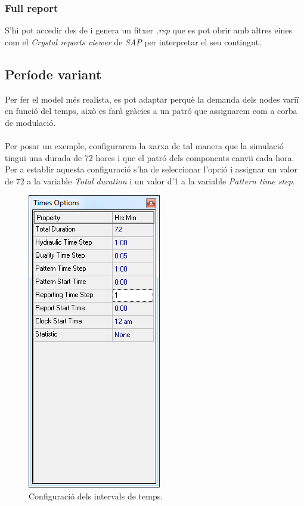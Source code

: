 \documentclass[12pt]{article}
\begin{document}
\pagebreak
\subsubsection{Full report}
S'hi pot accedir des de  i genera un fitxer \textit{.rep} que es pot obrir amb altres eines com el \textit{Crystal reports viewer}\cite{crystalReports} de \textit{SAP} per interpretar el seu contingut.


\pagebreak
\subsection{Període variant}
Per fer el model més realista, es pot adaptar perquè la demanda dels nodes variï en funció del temps, això es farà gràcies a un patró que assignarem com a corba de modulació. 
\\\\Per posar un exemple, configurarem la xarxa de tal manera que la simulació tingui una durada de 72 hores i que el patró dels components canviï cada hora. Per a establir aquesta configuració s'ha de seleccionar l'opció  i assignar un valor de 72 a la variable \textit{Total duration} i un valor d'1 a la variable \textit{Pattern time step}.
\begin{figure}[h!]
	\centering
	\includegraphics[scale=.7]{imatges/epanet/15.png}
	\caption{Configuració dels intervals de temps.}
\end{figure}
\end{document}
